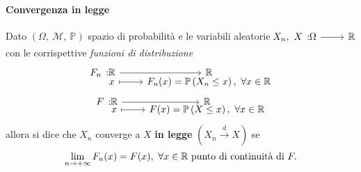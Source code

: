 \paragraph{Convergenza in legge}
\begin{define}
	Dato $\left(\Omega,\ \mathcal{M},\ \mathbb{P}\right)$ spazio di probabilità e le variabili aleatorie $\funz{X_n,\ X}{\Omega}{\realset}$ con le corrispettive \textit{funzioni di distribuzione}
	\begin{gather*}
		\funztot{F_n}{\realset}{\realset}{x}{F_n(x)=\mathbb{P}\left(X_n\leq x\right),\ \forall x\in \realset}\\
		\funztot{F}{\realset}{\realset}{x}{F(x)=\mathbb{P}\left(X\leq x\right),\ \forall x\in \realset}
	\end{gather*}
	allora si dice che $X_n$ converge a $X$ \textbf{in legge} $\left(X_n\stackrel{d}{\to}X\right)$ se
	\begin{equation}
		\lim_{n\to+\infty}F_n(x)=F(x),\ \forall x\in\mathbb{R}\ \text{punto di continuità di }F.
	\end{equation}
\end{define}
